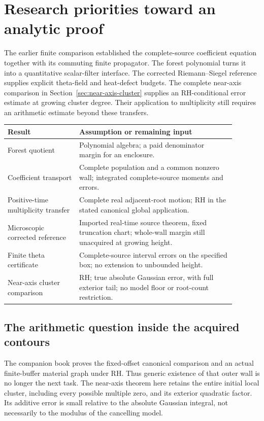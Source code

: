\section{Research priorities toward an analytic proof}
\label{sec:outlook}
The earlier finite comparison established the complete-source coefficient
equation together with its commuting finite propagator. The forest polynomial
turns it into a quantitative scalar-filter interface. The corrected Riemann--Siegel reference supplies explicit theta-field
and heat-defect budgets. The complete near-axis comparison in
Section~\ref{sec:near-axis-cluster} supplies an RH-conditional error
estimate at growing cluster degree. Their application to multiplicity
still requires an arithmetic estimate beyond these transfers.

\begin{center}
\begin{tabular}{>{\raggedright\arraybackslash}p{0.28\linewidth}>{\raggedright\arraybackslash}p{0.61\linewidth}}
\toprule
Result & Assumption or remaining input \\
\midrule
Forest quotient & Polynomial algebra; a paid denominator margin for an enclosure.\\
Coefficient transport & Complete population and a common nonzero wall; integrated complete-source moments and errors.\\
Positive-time multiplicity transfer & Complete real adjacent-root motion; RH in the stated canonical global application.\\
Microscopic corrected reference & Imported real-time source theorem, fixed truncation chart; whole-wall margin still unacquired at growing height.\\
Finite theta certificate & Complete-source interval errors on the specified box; no extension to unbounded height.\\
Near-axis cluster comparison & RH; true absolute Gaussian error, with full exterior tail; no model floor or root-count restriction.\\
\bottomrule
\end{tabular}
\end{center}

\subsection{The arithmetic question inside the acquired contours}
The companion book \cite{book-contours} proves the fixed-offset canonical
comparison and an actual finite-buffer material graph under RH. Thus
generic existence of that outer wall is no longer the next task.
The near-axis theorem here retains the entire initial local cluster,
including every possible multiple zero, and its exterior quadratic
factor. Its additive error is small relative to the absolute Gaussian
integral, not necessarily to the modulus of the cancelling model.

